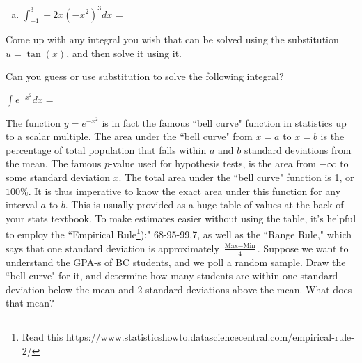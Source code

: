 \documentclass[answers]{exam}
\begin{document}
\begin{questions}
\begin{enumerate}[(a)]
	\item $\displaystyle \int_{-1}^3 -2x(-x^2)^3 dx$ = 
	
	\hfill \break
	\hfill \break
	\hfill \break
	\hfill \break
	
\end{enumerate}

\question Come up with any integral you wish that can be solved using the substitution $u = \tan(x)$, and then solve it using it.

\hfill \break
\hfill \break
\hfill \break
\hfill \break
\hfill \break
\hfill \break

\question Can you guess or use substitution to solve the following integral?

$\displaystyle \int e^{-x^2} dx =  $

\hfill \break
\hfill \break
\hfill \break

\question The function $y = e^{-x^2}$ is in fact the famous ``bell curve" function in statistics up to a scalar multiple. The area under the ``bell curve" from $x = a$ to $x = b$ is the percentage of total population that falls within $a$ and $b$ standard deviations from the mean. The famous $p$-value used for hypothesis tests, is the area from $-\infty$ to some standard deviation $x$. The total area under the ``bell curve" function is 1, or $100\%$. It is thus imperative to know the exact area under this function for any interval $a$ to $b$. This is usually provided as a huge table of values at the back of your stats textbook. To make estimates easier without using the table, it's helpful to employ the ``Empirical Rule\footnote{Read this https://www.statisticshowto.datasciencecentral.com/empirical-rule-2/}):" 68-95-99.7, as well as the ``Range Rule," which says that one standard deviation is approximately $\frac{\text{Max}-\text{Min}}{4}$. Suppose we want to understand the GPA-s of BC students, and we poll a random sample. Draw the ``bell curve" for it, and determine how many students are within one standard deviation below the mean and 2 standard deviations above the mean. What does that mean?


\end{questions}
\end{document}
